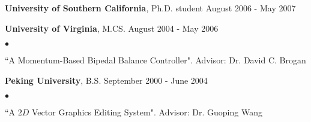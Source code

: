 \documentclass[margin,line]{res}
\newenvironment{list2}{
  \begin{list}{$\bullet$}{%
      \setlength{\itemsep}{0in}
      \setlength{\parsep}{0in} \setlength{\parskip}{0in}
      \setlength{\topsep}{0in} \setlength{\partopsep}{0in} 
      \setlength{\leftmargin}{0.2in}}}{\end{list}}
\begin{document}
\begin{resume}
\vspace*{-.1in}
{\bf University of Southern California}, Ph.D. student \hfill August 2006 - May 2007

\vspace*{-.1in}
{\bf University of Virginia}, M.CS. \hfill August 2004 - May 2006 \\
\begin{list2}
\vspace*{-.15in}
\item ``A Momentum-Based Bipedal Balance Controller". Advisor: Dr. David C. Brogan
\end{list2}

\vspace*{-.1in}
{\bf Peking University}, B.S. \hfill September 2000 - June 2004 \\
\begin{list2}
\vspace*{-.15in}
\item ``A $2D$ Vector Graphics Editing System". Advisor: Dr. Guoping Wang
\end{list2}







\end{resume}
\end{document}
